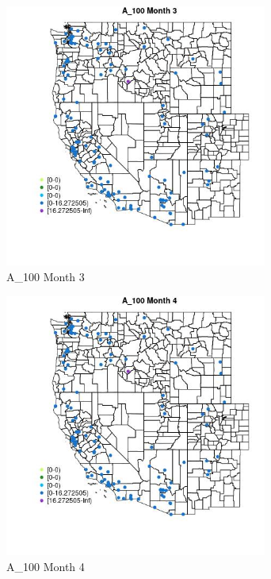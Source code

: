 \begin{figure} 
\centering  
\includegraphics[width=0.77\textwidth]{Code_Outputs/Report_ML_input_PM25_Step4_part_e_de_duplicated_aves_MapObsMo3A_100.jpg} 
\caption{\label{fig:Report_ML_input_PM25_Step4_part_e_de_duplicated_avesMapObsMo3A_100}A_100 Month 3} 
\end{figure} 
 

\begin{figure} 
\centering  
\includegraphics[width=0.77\textwidth]{Code_Outputs/Report_ML_input_PM25_Step4_part_e_de_duplicated_aves_MapObsMo4A_100.jpg} 
\caption{\label{fig:Report_ML_input_PM25_Step4_part_e_de_duplicated_avesMapObsMo4A_100}A_100 Month 4} 
\end{figure} 
 

